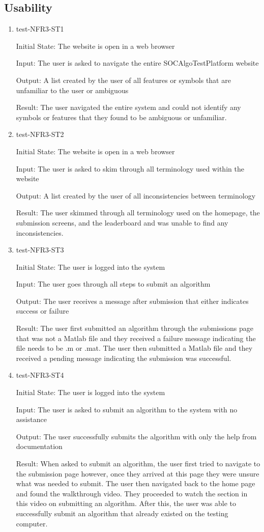 \documentclass[12pt, titlepage]{article}
\begin{document}
\subsection{Usability}
\begin{enumerate}

\item{test-NFR3-ST1} \label{test-NFR3-ST1}

Initial State: The website is open in a web browser

Input: The user is asked to navigate the entire SOCAlgoTestPlatform website

Output: A list created by the user of all features or symbols that are unfamiliar to the user or ambiguous

Result: The user navigated the entire system and could not identify any symbols or features that they found to be ambiguous or unfamiliar. 
\item{test-NFR3-ST2} \label{test-NFR3-ST2}

Initial State: The website is open in a web browser

Input: The user is asked to skim through all terminology used within the website

Output: A list created by the user of all inconsistencies between terminology

Result: The user skimmed through all terminology used on the homepage, the submission screens, and the leaderboard and was unable to find any inconsistencies. 
\item{test-NFR3-ST3} \label{test-NFR3-ST3}

Initial State: The user is logged into the system

Input: The user goes through all steps to submit an algorithm

Output: The user receives a message after submission that either indicates success or failure

Result: The user first submitted an algorithm through the submissions page that was not a Matlab file and they received a failure message indicating the file needs to be .m or .mat. The user then submitted a Matlab file and they received a pending message indicating the submission was successful. 
\item{test-NFR3-ST4} \label{test-NFR3-ST4}

Initial State: The user is logged into the system

Input: The user is asked to submit an algorithm to the system with no assistance 

Output: The user successfully submits the algorithm with only the help from documentation

Result: When asked to submit an algorithm, the user first tried to navigate to the submission page however, once they arrived at this page they were unsure what was needed to submit. The user then navigated back to the home page and found the walkthrough video. They proceeded to watch the section in this video on submitting an algorithm. After this, the user was able to successfully submit an algorithm that already existed on the testing computer.
\end{enumerate}
\end{document}
